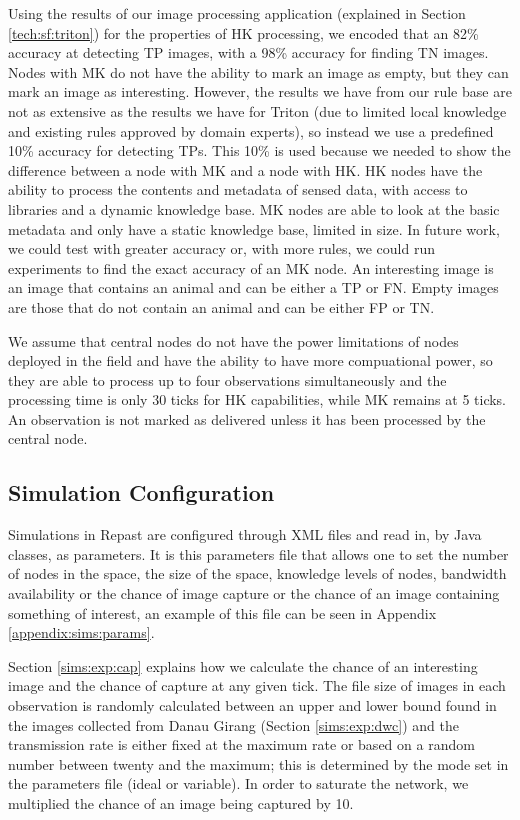 	Using the results of our image processing application (explained in Section \ref{tech:sf:triton}) for the properties of HK processing, we encoded that an 82\% accuracy at detecting TP images, with a 98\% accuracy for finding TN images. Nodes with MK do not have the ability to mark an image as empty, but they can mark an image as interesting. However, the results we have from our rule base are not as extensive as the results we have for Triton (due to limited local knowledge and existing rules approved by domain experts), so instead we use a predefined 10\% accuracy for detecting TPs. This 10\% is used because we needed to show the difference between a node with MK and a node with HK. HK nodes have the ability to process the contents and metadata of sensed data, with access to libraries and a dynamic knowledge base. MK nodes are able to look at the basic metadata and only have a static knowledge base, limited in size. In future work, we could test with greater accuracy or, with more rules, we could run experiments to find the exact accuracy of an MK node. An interesting image is an image that contains an animal and can be either a TP or FN. Empty images are those that do not contain an animal and can be either FP or TN.

	We assume that central nodes do not have the power limitations of nodes deployed in the field and have the ability to have more compuational power, so they are able to process up to four observations simultaneously and the processing time is only 30 ticks for HK capabilities, while MK remains at 5 ticks. An observation is not marked as delivered unless it has been processed by the central node.

\subsection{Simulation Configuration}
	Simulations in Repast are configured through XML files and read in, by Java classes, as parameters. It is this parameters file that allows one to set the number of nodes in the space, the size of the space, knowledge levels of nodes, bandwidth availability or the chance of image capture or the chance of an image containing something of interest, an example of this file can be seen in Appendix \ref{appendix:sims:params}.

	Section \ref{sims:exp:cap} explains how we calculate the chance of an interesting image and the chance of capture at any given tick. The file size of images in each observation is randomly calculated between an upper and lower bound found in the images collected from Danau Girang (Section \ref{sims:exp:dwc}) and the transmission rate is either fixed at the maximum rate or based on a random number between twenty and the maximum; this is determined by the mode set in the parameters file (ideal or variable). In order to saturate the network, we multiplied the chance of an image being captured by 10.


